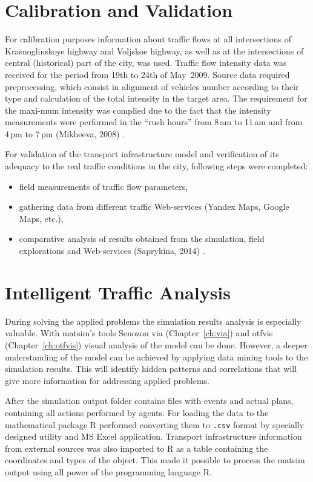 \section{Calibration and Validation}
For calibration purposes information about traffic flows at all intersections of Krasnoglinskoye highway and Voljskoe highway, as well as at the intersections of central (historical) part of the city, was used. Traffic flow intensity data was received for the period from 19th to 24th of May~2009. Source data required preprocessing, which consist in alignment of vehicles number according to their type and calculation of the total intensity in the target area. The requirement for the maxi-mum intensity was complied due to the fact that the intensity measurements were performed in the ``rush hours'' from 8\,am to 11\,am and from 4\,pm to 7\,pm (Mikheeva, 2008) \citep[][]{}. 

For validation of the transport infrastructure model and verification of its adequacy to the real traffic conditions in the city, following steps were completed: 
\begin{itemize}
\item field measurements of traffic flow parameters,
\item gathering data from different traffic Web-services (Yandex Maps, Google Maps, etc.),
\item comparative analysis of results obtained from the simulation, field explorations and Web-services (Saprykina, 2014) \citep[][]{}.
\end{itemize}

\section{Intelligent Traffic Analysis}
During solving the applied problems the simulation results analysis is especially valuable. 
With \gls{matsim}'s tools Senozon \gls{via} (Chapter~\ref{ch:via}) and \gls{otfvis} (Chapter~\ref{ch:otfvis}) visual analysis of the model can be done. 
However, a deeper understanding of the model can be achieved by applying data mining tools to the simulation results. 
This will identify hidden patterns and correlations that will give more information for addressing applied problems. 

After the simulation output folder contains files with events and actual plans, containing all actions performed by agents. For loading the data to the mathematical package R performed converting them to \lstinline|.csv| format by specially designed utility and MS Excel application. Transport infrastructure information from external sources was also imported to R as a table containing the coordinates and types of the object. This made it possible to process the \gls{matsim} output using all power of the programming language R.


